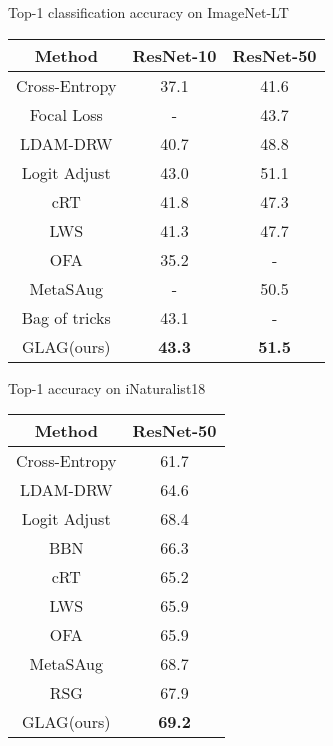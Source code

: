 \documentclass[runningheads]{llncs}
\begin{document}
\vspace{-20mm}
\begin{minipage}{\textwidth}
 \begin{minipage}[t]{0.55\textwidth}
  \centering
\makeatletter{}\makeatother\caption{Top-1 classification accuracy on ImageNet-LT}
    \vspace{3mm}
     \label{table:ImageNet result}
      \begin{tabular}{ccc} 
      \toprule
            Method & ResNet-10 & ResNet-50\\
            \hline
            Cross-Entropy  & 37.1 & 41.6 \\
            Focal Loss \cite{lin2017focal}     & -    & 43.7\\
            LDAM-DRW \cite{cao2019learning}    & 40.7 & 48.8\\
            Logit Adjust \cite{menon2020long}  & 43.0 & 51.1\\
            cRT \cite{kang2019decoupling}      & 41.8 & 47.3\\  
            LWS \cite{kang2019decoupling}      & 41.3 & 47.7\\
            OFA \cite{chu2020feature}          & 35.2 &-\\
            MetaSAug \cite{Li_2021_CVPR}       & -&50.5\\
            Bag of tricks \cite{zhang2021bag}  &43.1 &-\\
            GLAG(ours)  & {\bf43.3}  &{\bf51.5}\\
        \bottomrule
	\end{tabular}
  \end{minipage}
  \hspace{2mm}
  \begin{minipage}[t]{0.3\textwidth}
  \centering
\makeatletter{}\makeatother\caption{Top-1 accuracy on iNaturalist18}
    \vspace{3mm}
    \label{table:iNat result}
         \begin{tabular}{cc}        
         \toprule
            Method & ResNet-50\\
            \hline
            Cross-Entropy  & 61.7 \\
            LDAM-DRW \cite{cao2019learning}    & 64.6\\
            Logit Adjust\cite{menon2020long}  & 68.4\\
            BBN \cite{zhou2020bbn}             & 66.3 \\
            cRT \cite{kang2019decoupling}      & 65.2\\  
            LWS \cite{kang2019decoupling}      & 65.9\\
            OFA \cite{chu2020feature}          & 65.9\\
            MetaSAug \cite{Li_2021_CVPR}       & 68.7\\
            RSG \cite{wang2021rsg}             &67.9\\
GLAG(ours)  & {\bf69.2}\\
        \bottomrule
	  \end{tabular}
  \end{minipage}
\end{minipage}
\end{document}
